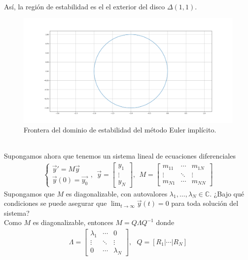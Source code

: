 \begin{ejemplo}
\begin{align*}
\end{align*}
Así, la región de estabilidad es el el exterior del disco $\Delta(1,1)$.
\begin{figure}[H]
    \centering
    \includegraphics[width=1\textwidth]{imagenes/Euler_implicito.png}
    \caption*{Frontera del dominio de estabilidad del método Euler implícito.}
\end{figure}
\end{ejemplo}
\\
\newline
\noindent Supongamos ahora que tenemos un sistema lineal de ecuaciones diferenciales
\begin{align*}
    \left\{ \begin{array}{lcc}
             \overrightarrow{y}' = M\overrightarrow{y}\\
             \overrightarrow{y}(0) = \overrightarrow{y_0} 
             \end{array}
   \right., \ \ \overrightarrow{y} = \begin{bmatrix}
y_1\\
\vdots\\
y_N
\end{bmatrix}, \ \ M = \begin{bmatrix}
m_{11} & \cdots & m_{1N}\\
\vdots & \ddots & \vdots \\
m_{N1} & \cdots & m_{NN}
\end{bmatrix}
\end{align*}
Supongamos que $M$ es diagonalizable, con autovalores $\lambda_1,\ldots,\lambda_N \in \mathbb{C}$. ¿Bajo qué condiciones se puede asegurar que $\lim_{t \to \infty} \overrightarrow{y}(t) = 0$ para toda solución del sistema?
\\
\newline
Como $M$ es diagonalizable, entonces $M = Q\Lambda Q^{-1}$ donde
\begin{align*}
  \Lambda = \begin{bmatrix}
\lambda_1 & \cdots & 0\\
\vdots & \ddots & \vdots \\
0 & \cdots & \lambda_N
\end{bmatrix}, \ \ \ Q = [R_1 | \cdots | R_N]  
\end{align*}
